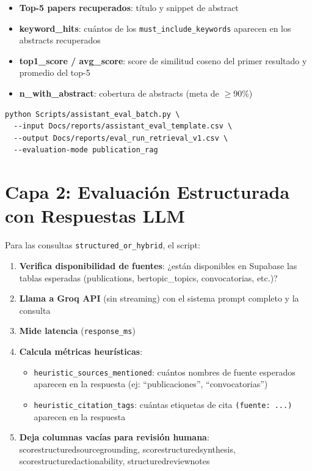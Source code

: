 \documentclass[12pt,a4paper]{report}
\newcommand{\filebreak}{\char95\allowbreak}
\newcommand{\ttb}[1]{{\ttfamily\let\_\filebreak #1}}
\begin{document}
\begin{itemize}
  \item \textbf{Top-5 papers recuperados}: título y snippet de abstract
  \item \textbf{keyword\_hits}: cuántos de los \texttt{must\_include\_keywords} aparecen en los abstracts recuperados
  \item \textbf{top1\_score / avg\_score}: score de similitud coseno del primer resultado y promedio del top-5
  \item \textbf{n\_with\_abstract}: cobertura de abstracts (meta de $\geq$90\%)
\end{itemize}

\begin{lstlisting}[style=bashstyle, caption={Ejecutar evaluación de retrieval}]
python Scripts/assistant_eval_batch.py \
  --input Docs/reports/assistant_eval_template.csv \
  --output Docs/reports/eval_run_retrieval_v1.csv \
  --evaluation-mode publication_rag
\end{lstlisting}

\section{Capa 2: Evaluación Estructurada con Respuestas LLM}

Para las consultas \texttt{structured\_or\_hybrid}, el script:

\begin{enumerate}
  \item \textbf{Verifica disponibilidad de fuentes}: ¿están disponibles en Supabase las tablas esperadas (publications, bertopic\_topics, convocatorias, etc.)?
  \item \textbf{Llama a Groq API} (sin streaming) con el sistema prompt completo y la consulta
  \item \textbf{Mide latencia} (\texttt{response\_ms})
  \item \textbf{Calcula métricas heurísticas}:
    \begin{itemize}
      \item \texttt{heuristic\_sources\_mentioned}: cuántos nombres de fuente esperados aparecen en la respuesta (ej: ``publicaciones'', ``convocatorias'')
      \item \texttt{heuristic\_citation\_tags}: cuántas etiquetas de cita \texttt{(fuente: ...)} aparecen en la respuesta
    \end{itemize}
  \item \textbf{Deja columnas vacías para revisión humana}: \ttb{score\_structured\_source\_grounding}, \ttb{score\_structured\_synthesis}, \ttb{score\_structured\_actionability}, \ttb{structured\_review\_notes}
\end{enumerate}
\end{document}
